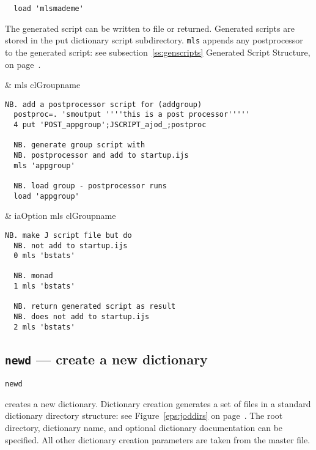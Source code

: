 \begin{verbatim}
  load 'mlsmademe'
\end{verbatim}

The generated script can be written to file or returned. 
Generated scripts are stored in the put dictionary script subdirectory.  
\texttt{mls} appends any postprocessor to the generated script: 
see subsection~\ref{ss:genscripts} Generated Script Structure, on page~\pageref{ss:genscripts}.

\begin{wordhead}
\monad & mls clGroupname \\
\end{wordhead}
\begin{lstlisting}[frame=single,framerule=0pt] 
  NB. add a postprocessor script for (addgroup) 
  postproc=. 'smoutput ''''this is a post processor'''''
  4 put 'POST_appgroup';JSCRIPT_ajod_;postproc  

  NB. generate group script with 
  NB. postprocessor and add to startup.ijs
  mls 'appgroup' 
  
  NB. load group - postprocessor runs
  load 'appgroup' 
\end{lstlisting}

\begin{wordhead}
\dyad & iaOption mls clGroupname \\
\end{wordhead}
\begin{lstlisting}[frame=single,framerule=0pt] 
  NB. make J script file but do 
  NB. not add to startup.ijs
  0 mls 'bstats' 

  NB. monad 
  1 mls 'bstats' 

  NB. return generated script as result 
  NB. does not add to startup.ijs  
  2 mls 'bstats' 
\end{lstlisting}


\subsection{\texttt{newd} --- create a new dictionary}\label{ss:newd} 

 \hypertarget{il:newd}{\texttt{newd}} creates 
 a new dictionary. 
 Dictionary creation generates
 a set of files in a standard dictionary directory structure:
 see Figure~\ref{eps:joddirs} on page~\pageref{eps:joddirs}.
  The root directory, dictionary name, and optional dictionary 
 documentation can be specified. All other dictionary 
 creation parameters are taken from the master file.
 
